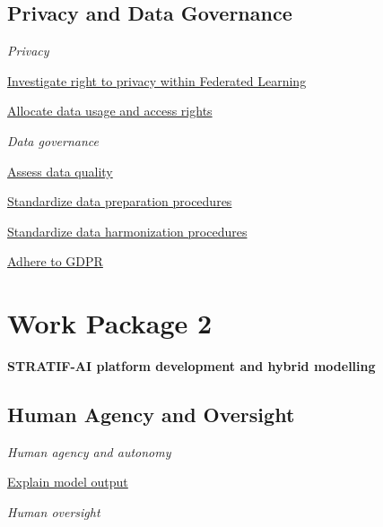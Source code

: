 \documentclass[
  letterpaper,
  DIV=11,
  numbers=noendperiod]{scrreport}
\begin{document}
\hypertarget{privacy-and-data-governance-1}{%
\section*{Privacy and Data
Governance}\label{privacy-and-data-governance-1}}


\emph{Privacy}

\protect\hyperlink{investigate-right-to-privacy-within-federated-learning}{Investigate
right to privacy within Federated Learning}

\protect\hyperlink{allocate-data-usage-and-access-rights}{Allocate data
usage and access rights}

\emph{Data governance}

\protect\hyperlink{assess-data-quality}{Assess data quality}

\protect\hyperlink{standardize-data-preparation-procedures}{Standardize
data preparation procedures}

\protect\hyperlink{standardize-data-harmonization-procedures}{Standardize
data harmonization procedures}

\protect\hyperlink{adhere-to-gdpr}{Adhere to GDPR}


\hypertarget{work-package-2}{%
\chapter*{Work Package 2}\label{work-package-2}}


\textbf{STRATIF-AI platform development and hybrid modelling}

\hypertarget{human-agency-and-oversight-1}{%
\section*{Human Agency and
Oversight}\label{human-agency-and-oversight-1}}


\emph{Human agency and autonomy}

\protect\hyperlink{explain-model-output}{Explain model output}

\emph{Human oversight}
\end{document}
